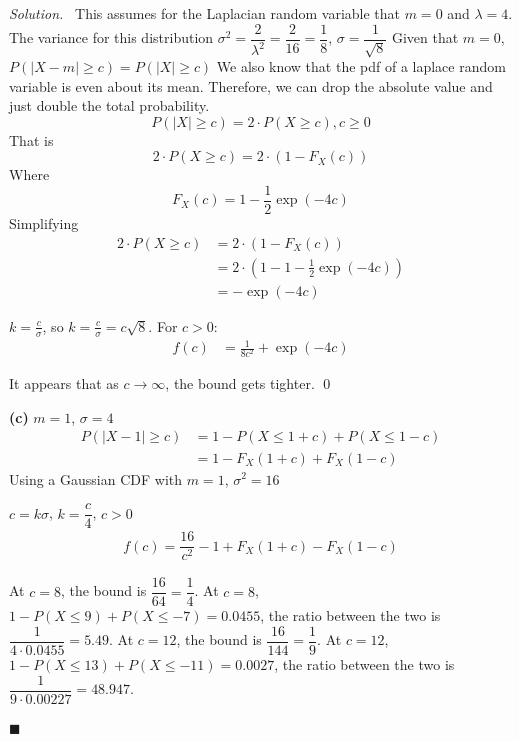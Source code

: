 \documentclass[11pt]{article}
\newenvironment{solution}
{\par\medskip\noindent\textit{Solution.}\ }
{\hfill$\blacksquare$\par\medskip}
\begin{document}
\begin{solution}
        This assumes for the Laplacian random variable that $m = 0$ and $\lambda = 4$.
        The variance for this distribution $\sigma^2 = \dfrac{2}{\lambda^2} = \dfrac{2}{16} = \dfrac{1}{8}$, $\sigma = \dfrac{1}{\sqrt{8}}$
        Given that $m = 0$, $P(|X - m| \geq c) = P(|X| \geq c)$
        We also know that the pdf of a laplace random variable is even about its mean.
        Therefore, we can drop the absolute value and just double the total probability.
        \[
            P(|X| \geq c) = 2 \cdot P(X \geq c), c \geq 0
        \]
        That is
        \[
            2 \cdot P(X \geq c) = 2 \cdot (1 - F_X(c))
        \]
        Where
        \[
            F_X(c) = 1 - \frac{1}{2} \exp\left(-4c\right)
        \]
        Simplifying
        \begin{align*}
            2 \cdot P(X \geq c) &= 2 \cdot (1 - F_X(c)) \\
            &= 2 \cdot (1 - 1 - \frac{1}{2} \exp\left(-4c\right)) \\
            &= - \exp\left(-4c\right)
        \end{align*}

        $k = \frac{c}{\sigma}$, so $k = \frac{c}{\sigma} = c\sqrt{8}$.
        For $c > 0$:
        \begin{align*}
            f(c) &= \frac{1}{8c^2} + \exp\left(-4c\right)
        \end{align*}

        It appears that as $c \to \infty$, the bound gets tighter.
        \qed

        \vspace{1em}
        \textbf{(c)}
        $m = 1$, $\sigma = 4$
        \begin{align*}
            P(|X - 1| \geq c) &= 1 - P(X \leq 1 + c) + P(X \leq 1 - c) \\
            &= 1 - F_X(1 + c) + F_X(1 - c)
        \end{align*}
        Using a Gaussian CDF with $m = 1$, $\sigma^2 = 16$

        $c = k\sigma$, $k = \dfrac{c}{4}$, $c > 0$
        \begin{align*}
            f(c) = \dfrac{16}{c^2} -  1 + F_X(1 + c) - F_X(1 - c)
        \end{align*}

        At $c = 8$, the bound is $\dfrac{16}{64} = \dfrac{1}{4}$.
        At $c = 8$, $1 - P(X \leq 9) + P(X \leq -7) = 0.0455$, the ratio between the two is $\dfrac{1}{4\cdot0.0455} = 5.49$.
        At $c = 12$, the bound is $\dfrac{16}{144} = \dfrac{1}{9}$.
        At $c = 12$, $1 - P(X \leq 13) + P(X \leq -11) = 0.0027$, the ratio between the two is $\dfrac{1}{9\cdot0.00227} = 48.947$.


\end{solution}
\end{document}
